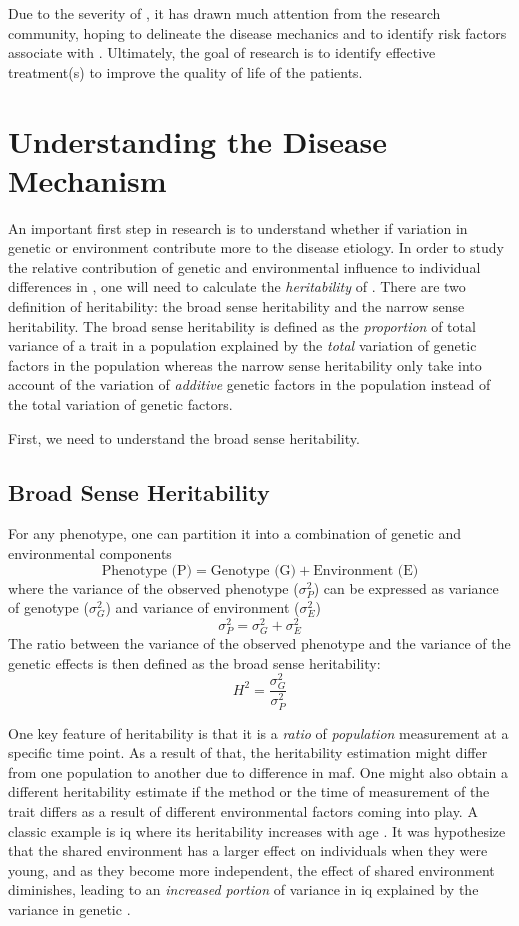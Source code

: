 	Due to the severity of , it has drawn much attention from the research community, hoping to delineate the disease mechanics and to identify risk factors associate with .
	Ultimately, the goal of  research is to identify effective treatment(s) to improve the quality of life of the patients.
	
	\section{Understanding the Disease Mechanism}
	An important first step in  research is to understand whether if variation in genetic or environment contribute more to the disease etiology.
	In order to study the relative contribution of genetic and environmental influence to individual differences in , one will need to calculate the \emph{heritability} of .
	There are two definition of heritability: the broad sense heritability and the narrow sense heritability.
	The broad sense heritability is defined as the \emph{proportion} of total variance of a trait in a population explained by the \emph{total} variation of genetic factors in the population whereas the narrow sense heritability only take into account of the variation of \emph{additive} genetic factors in the population instead of the total variation of genetic factors.
	
	First, we need to understand the broad sense heritability.
	\subsection{Broad Sense Heritability}
	For any phenotype, one can partition it into a combination of genetic and environmental components \citep{Falconer1996}
	$$
	\text{Phenotype (P)}=\text{Genotype (G)}+\text{Environment (E)}
	$$
	where the variance of the observed phenotype ($\sigma_P^2$) can be expressed as variance of genotype ($\sigma_G^2$) and variance of environment ($\sigma_E^2$)
	$$
	\sigma_P^2=\sigma_G^2+\sigma_E^2
	$$
	The ratio between the variance of the observed phenotype and the variance of the genetic effects is then defined as the broad sense heritability:
	$$
	H^2=\frac{\sigma_G^2}{\sigma_P^2}
	$$
	
	One key feature of heritability is that it is a \emph{ratio} of \emph{population} measurement at a specific time point.
	As a result of that, the heritability estimation might differ from one population to another due to difference in \gls{maf}.
	One might also obtain a different heritability estimate if the method or the time of measurement of the trait differs as a result of different environmental factors coming into play.
	A classic example is \gls{iq} where its heritability increases with age \citep{Bouchard2013}.
	It was hypothesize that the shared environment has a larger effect on individuals when they were young, and as they become more independent, the effect of shared environment diminishes, leading to an \emph{increased portion} of variance in \gls{iq} explained by the variance in genetic \citep{Bouchard2013}. 
	
